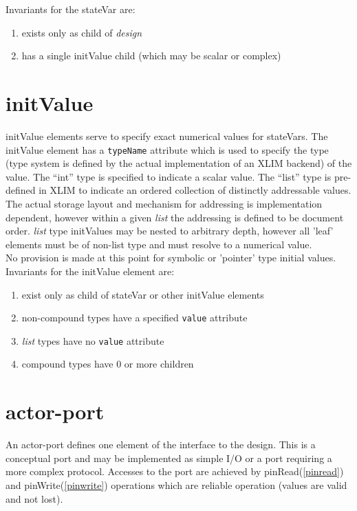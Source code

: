Invariants for the stateVar are:\\
\begin{enumerate}
\item exists only as child of {\it design}
\item has a single initValue child (which may be scalar or complex)
\end{enumerate}

\section{initValue}
initValue elements serve to specify exact numerical values for stateVars.  The initValue
element has a {\tt typeName} attribute which is used to specify the type (type system is
defined by the actual implementation of an XLIM backend) of the value.  The ``int'' type
is specified to indicate a scalar value.  The ``list'' type is pre-defined in XLIM to
indicate an ordered collection of distinctly addressable values.  The actual storage
layout and mechanism for addressing is implementation dependent, however within a given
{\it list} the addressing is defined to be document order.  {\it list} type initValues may
be nested to arbitrary depth, however all 'leaf' elements must be of non-list type and
must resolve to a numerical value.\\
No provision is made at this point for symbolic or 'pointer' type initial values.\\
Invariants for the initValue element are:\\
\begin{enumerate}
\item exist only as child of stateVar or other initValue elements
\item non-compound types have a specified {\tt value} attribute
\item {\it list} types have no {\tt value} attribute
\item compound types have 0 or more children
\end{enumerate}

\section{actor-port}\label{actorport}
An actor-port defines one element of the interface to the design.  This is a conceptual
port and may be implemented as simple I/O or a port requiring a more complex protocol.
Accesses to the port are achieved by pinRead(\ref{pinread}) and pinWrite(\ref{pinwrite})
operations which are reliable operation (values are valid and not lost).

